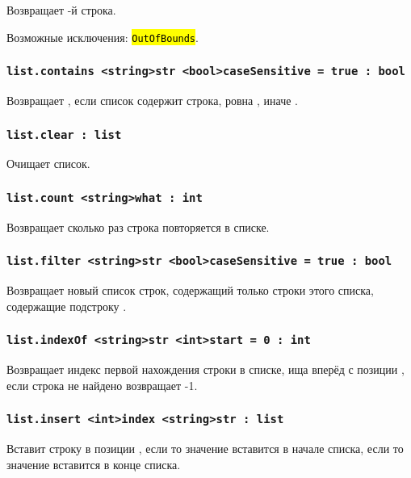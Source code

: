 \documentclass[a4paper, 14pt]{extarticle}
\newcommand{\ferror}[1]{\foreignlanguage{english}{\fontsize{11pt}{12pt}\tt{\sethlcolor{yellow}\hl{#1}}}}
\begin{document}
Возвращает -й строка.

Возможные исключения: \ferror{OutOfBounds}.

\subsubsection{\lstinline|list.contains <string>str <bool>caseSensitive = true : bool|}

Возвращает \true, если список содержит строка, ровна , иначе \false.

\subsubsection{\lstinline|list.clear : list|}

Очищает список.

\subsubsection{\lstinline|list.count <string>what : int|}

Возвращает сколько раз строка  повторяется в списке.

\subsubsection{\lstinline|list.filter <string>str <bool>caseSensitive = true : bool|}

Возвращает новый список строк, содержащий только строки этого списка, содержащие подстроку . 

\subsubsection{\lstinline|list.indexOf <string>str <int>start = 0 : int|}

Возвращает индекс первой нахождения строки  в списке, ища вперёд с позиции , если строка не найдено возвращает -1.

\subsubsection{\lstinline|list.insert <int>index <string>str : list|}

Вставит строку  в позиции , если  то значение вставится в начале списка, если  то значение вставится в конце списка.
\end{document}

